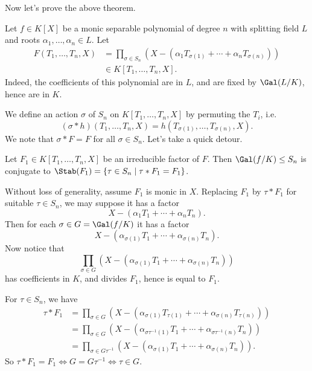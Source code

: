 \documentclass[12pt]{article}
\begin{document}
Now let's prove the above theorem.

\begin{proofbox}
	Let $f \in K[X]$ be a monic separable polynomial of degree $n$ with splitting field $L$ and roots $\alpha_1, \ldots, \alpha_n \in L$. Let
	\begin{align*}
		F(T_1, \ldots, T_n, X) &= \prod_{\sigma \in S_n}(X - (\alpha_1 T_{\sigma(1)} + \cdots + \alpha_n T_{\sigma(n)})) \\
				       &\in K[T_1, \ldots, T_n, X].
	\end{align*}
	Indeed, the coefficients of this polynomial are in $L$, and are fixed by $\Gal(L/K)$, hence are in $K$.

	We define an action $\sigma$ of $S_n$ on $K[T_1, \ldots, T_n, X]$ by permuting the $T_i$, i.e.
	\[
		(\sigma \ast h) (T_1, \ldots, T_n, X) = h(T_{\sigma(1)}, \ldots, T_{\sigma(n)}, X).
	\]
	We note that $\sigma \ast F = F$ for all $\sigma \in S_n$. Let's take a quick detour.
\end{proofbox}

\begin{lemma}
	Let $F_1 \in K[T_1, \ldots, T_n, X]$ be an irreducible factor of $F$. Then $\Gal(f/K) \leq S_n$ is conjugate to $\Stab(F_1) = \{\tau \in S_n \mid \tau \ast F_1 = F_1\}$.
\end{lemma}

\begin{proofbox}
	Without loss of generality, assume $F_1$ is monic in $X$. Replacing $F_1$ by $\tau \ast F_1$ for suitable $\tau \in S_n$, we may suppose it has a factor
	\[
	X - (\alpha_1 T_1 + \cdots + \alpha_n T_n).
	\]
	Then for each $\sigma \in G = \Gal(f/K)$ it has a factor
	\[
	X - (\alpha_{\sigma(1)}T_1 + \cdots + \alpha_{\sigma(n)} T_n).
	\]
	Now notice that
	\[
	\prod_{\sigma \in G}(X - (\alpha_{\sigma(1)}T_1 + \cdots + \alpha_{\sigma(n)} T_n))
	\]
	has coefficients in $K$, and divides $F_1$, hence is equal to $F_1$.

	For $\tau \in S_n$, we have
	\begin{align*}
		\tau \ast F_1 &= \prod_{\sigma \in G} (X - (\alpha_{\sigma(1)} T_{\tau(1)} + \cdots + \alpha_{\sigma(n)} T_{\tau(n)})) \\
		&= \prod_{\sigma \in G} (X - (\alpha_{\sigma\tau^{-1}(1)}T_1 + \cdots + \alpha_{\sigma\tau^{-1}(n)}T_n)) \\
		&= \prod_{\sigma \in G \tau^{-1}}(X - (\alpha_{\sigma(1)} T_1 + \cdots + \alpha_{\sigma(n)}T_n)).
	\end{align*}
	So $\tau \ast F_1 = F_1 \iff G = G \tau^{-1} \iff \tau \in G$.
\end{proofbox}
\end{document}
